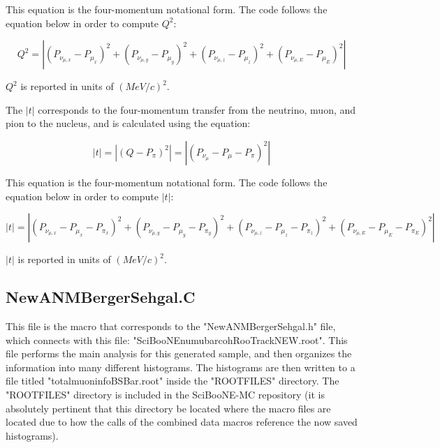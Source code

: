 \documentclass[11pt]{article}
\begin{document}
\noindent
This equation is the four-momentum notational form. The code follows the equation below in order to compute $Q^2$:

\begin{equation}
Q^2 = |(P_{\nu_{\mu,x}} - P_{\mu_x})^2 + (P_{\nu_{\mu,y}} - P_{\mu_y})^2 + (P_{\nu_{\mu,z}} - P_{\mu_z})^2 + (P_{\nu_{\mu,E}} - P_{\mu_E})^2|
\end{equation}

\noindent
$Q^2$ is reported in units of $(MeV/c)^2$.

The $|t|$ corresponds to the four-momentum transfer from the neutrino, muon, and pion to the nucleus, and is calculated using the equation:

\begin{equation}
|t| = |(Q - P_\pi)^2| = |(P_{\nu_\mu} - P_\mu - P_\pi)^2|
\end{equation}

\noindent
This equation is the four-momentum notational form. The code follows the equation below in order to compute $|t|$:

\begin{equation}
|t| = |(P_{\nu_{\mu,x}} - P_{\mu_x} - P_{\pi_x})^2 + (P_{\nu_{\mu,y}} - P_{\mu_y} - P_{\pi_y})^2 + (P_{\nu_{\mu,z}} - P_{\mu_z} - P_{\pi_z})^2 + (P_{\nu_{\mu,E}} - P_{\mu_E} - P_{\pi_E})^2|
\end{equation}

\noindent
$|t|$ is reported in units of $(MeV/c)^2$.

\subsection{NewANMBergerSehgal.C}
This file is the macro that corresponds to the "NewANMBergerSehgal.h" file, which connects with this file: "SciBooNE\textunderscore numubar\textunderscore coh\textunderscore RooTrack\textunderscore NEW.root". This file performs the main analysis for this generated sample, and then organizes the information into many different histograms. The histograms are then written to a file titled "totalmuoninfoBSBar.root" inside the "ROOTFILES" directory. The "ROOTFILES" directory is included in the SciBooNE-MC repository (it is absolutely pertinent that this directory be located where the macro files are located due to how the calls of the combined data macros reference the now saved histograms).
\end{document}
